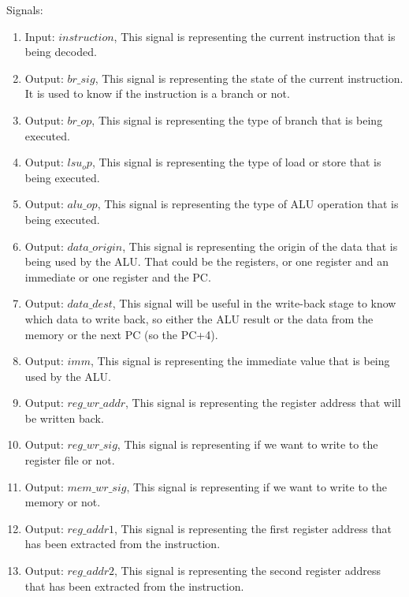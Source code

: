 Signals:
\begin{enumerate}[label={\textbullet}]
    \item Input: $instruction$, This signal is representing the current instruction that is being decoded.
    \item Output: $br\_sig$, This signal is representing the state of the current instruction. 
    It is used to know if the instruction is a branch or not.
    \item Output: $br\_op$, This signal is representing the type of branch that is being executed.
    \item Output: $lsu_op$, This signal is representing the type of load or store that is being executed.
    \item Output: $alu\_op$, This signal is representing the type of ALU operation that is being executed.
    \item Output: $data\_origin$, This signal is representing the origin of the data that is being used by the ALU.
    That could be the registers, or one register and an immediate or one register and the PC.
    \item Output: $data\_dest$, This signal will be useful in the write-back stage to know which data to write back,
    so either the ALU result or the data from the memory or the next PC (so the PC+4).
    \item Output: $imm$, This signal is representing the immediate value that is being used by the ALU.
    \item Output: $reg\_wr\_addr$, This signal is representing the register address that will be written back.
    \item Output: $reg\_wr\_sig$, This signal is representing if we want to write to the register file or not.
    \item Output: $mem\_wr\_sig$, This signal is representing if we want to write to the memory or not.
    \item Output: $reg\_addr1$, This signal is representing the first register address that has been extracted from the instruction.
    \item Output: $reg\_addr2$, This signal is representing the second register address that has been extracted from the instruction.
\end{enumerate}